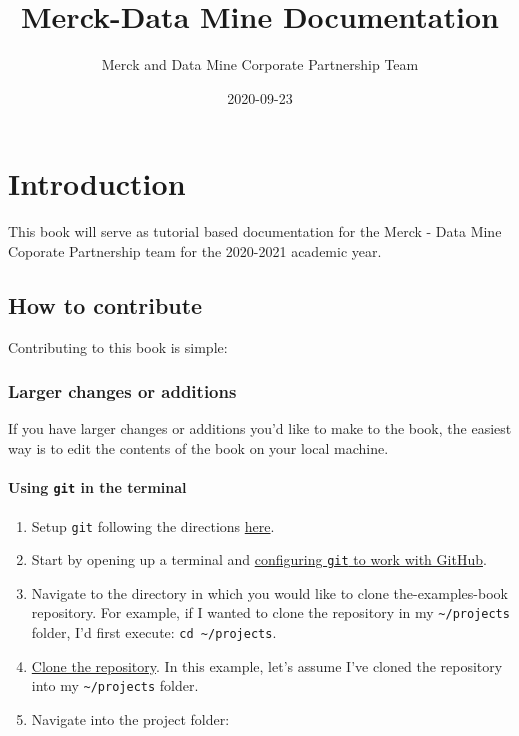 \documentclass[]{book}
\title{Merck-Data Mine Documentation}
\author{Merck and Data Mine Corporate Partnership Team}
\date{2020-09-23}
\providecommand{\tightlist}{%
  \setlength{\itemsep}{0pt}\setlength{\parskip}{0pt}}
\begin{document}
\maketitle

{
\setcounter{tocdepth}{1}
\tableofcontents
}
\chapter{Introduction}\label{introduction}

This book will serve as tutorial based documentation for the Merck -
Data Mine Coporate Partnership team for the 2020-2021 academic year.

\section{How to contribute}\label{how-to-contribute}

Contributing to this book is simple:

\subsection{Larger changes or
additions}\label{larger-changes-or-additions}

If you have larger changes or additions you'd like to make to the book,
the easiest way is to edit the contents of the book on your local
machine.

\subsubsection{\texorpdfstring{Using \texttt{git} in the
terminal}{Using git in the terminal}}\label{using-git-in-the-terminal}

\begin{enumerate}
\def\labelenumi{\arabic{enumi}.}
\tightlist
\item
  Setup \texttt{git} following the directions
  \protect\hyperlink{git-install}{here}.
\item
  Start by opening up a terminal and
  \protect\hyperlink{configure-git}{configuring \texttt{git} to work
  with GitHub}.
\item
  Navigate to the directory in which you would like to clone
  the-examples-book repository. For example, if I wanted to clone the
  repository in my \texttt{\textasciitilde{}/projects} folder, I'd first
  execute: \texttt{cd\ \textasciitilde{}/projects}.
\item
  \protect\hyperlink{git-clone-repository}{Clone the repository}. In
  this example, let's assume I've cloned the repository into my
  \texttt{\textasciitilde{}/projects} folder.
\item
  Navigate into the project folder:
\end{enumerate}
\end{document}
